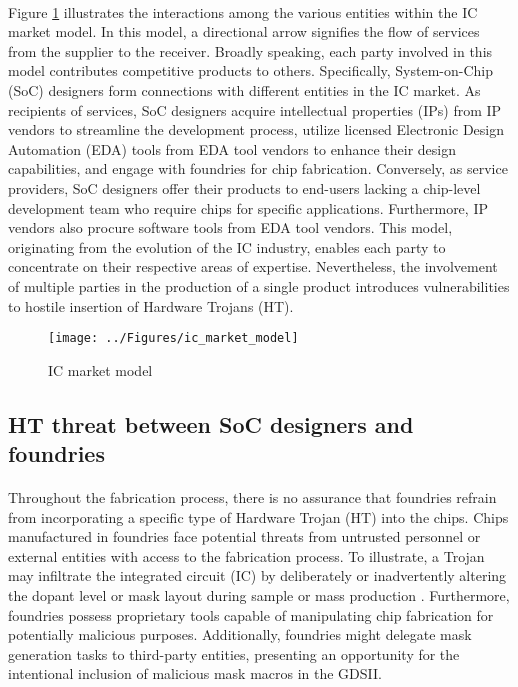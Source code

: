\paragraph*{}
Figure  \ref{fig:icmarketmodel} illustrates the interactions among the various entities within the IC market model. In this model, a directional arrow signifies the flow of services from the supplier to the receiver. Broadly speaking, each party involved in this model contributes competitive products to others. Specifically, System-on-Chip (SoC) designers form connections with different entities in the IC market. As recipients of services, SoC designers acquire intellectual properties (IPs) from IP vendors to streamline the development process, utilize licensed Electronic Design Automation (EDA) tools from EDA tool vendors to enhance their design capabilities, and engage with foundries for chip fabrication. Conversely, as service providers, SoC designers offer their products to end-users lacking a chip-level development team who require chips for specific applications. Furthermore, IP vendors also procure software tools from EDA tool vendors. This model, originating from the evolution of the IC industry, enables each party to concentrate on their respective areas of expertise. Nevertheless, the involvement of multiple parties in the production of a single product introduces vulnerabilities to hostile insertion of Hardware Trojans (HT).
\begin{figure}[h]
	\centering
	\texttt{[image: ../Figures/ic\_market\_model]}
	\caption{IC market model}
	\label{fig:icmarketmodel}
\end{figure}
\subsection{HT threat between SoC designers and foundries}
\paragraph*{}
Throughout the fabrication process, there is no assurance that foundries refrain from incorporating a specific type of Hardware Trojan (HT) into the chips. Chips manufactured in foundries face potential threats from untrusted personnel or external entities with access to the fabrication process. To illustrate, a Trojan may infiltrate the integrated circuit (IC) by deliberately or inadvertently altering the dopant level or mask layout during sample or mass production \cite{jacob2014hardware}. Furthermore, foundries possess proprietary tools capable of manipulating chip fabrication for potentially malicious purposes. Additionally, foundries might delegate mask generation tasks to third-party entities, presenting an opportunity for the intentional inclusion of malicious mask macros in the GDSII.
